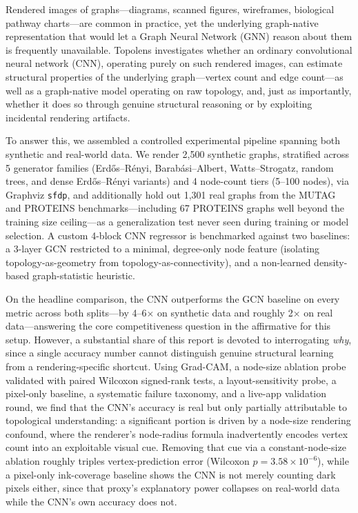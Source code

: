 \documentclass[11pt,letterpaper]{article}
\numberwithin{equation}{section}
\numberwithin{figure}{section}
\numberwithin{table}{section}
\begin{document}
Rendered images of graphs---diagrams, scanned figures, wireframes, biological pathway charts---are common in practice, yet the underlying graph-native representation that would let a Graph Neural Network (GNN) reason about them is frequently unavailable. Topolens investigates whether an ordinary convolutional neural network (CNN), operating purely on such rendered images, can estimate structural properties of the underlying graph---vertex count and edge count---as well as a graph-native model operating on raw topology, and, just as importantly, whether it does so through genuine structural reasoning or by exploiting incidental rendering artifacts.

To answer this, we assembled a controlled experimental pipeline spanning both synthetic and real-world data. We render 2,500 synthetic graphs, stratified across 5 generator families (Erdős--Rényi, Barabási--Albert, Watts--Strogatz, random trees, and dense Erdős--Rényi variants) and 4 node-count tiers (5--100 nodes), via Graphviz \texttt{sfdp}, and additionally hold out 1,301 real graphs from the MUTAG and PROTEINS benchmarks---including 67 PROTEINS graphs well beyond the training size ceiling---as a generalization test never seen during training or model selection. A custom 4-block CNN regressor is benchmarked against two baselines: a 3-layer GCN restricted to a minimal, degree-only node feature (isolating topology-as-geometry from topology-as-connectivity), and a non-learned density-based graph-statistic heuristic.

On the headline comparison, the CNN outperforms the GCN baseline on every metric across both splits---by 4--6$\times$ on synthetic data and roughly 2$\times$ on real data---answering the core competitiveness question in the affirmative for this setup. However, a substantial share of this report is devoted to interrogating \emph{why}, since a single accuracy number cannot distinguish genuine structural learning from a rendering-specific shortcut. Using Grad-CAM, a node-size ablation probe validated with paired Wilcoxon signed-rank tests, a layout-sensitivity probe, a pixel-only baseline, a systematic failure taxonomy, and a live-app validation round, we find that the CNN's accuracy is real but only partially attributable to topological understanding: a significant portion is driven by a node-size rendering confound, where the renderer's node-radius formula inadvertently encodes vertex count into an exploitable visual cue. Removing that cue via a constant-node-size ablation roughly triples vertex-prediction error (Wilcoxon $p=3.58\times10^{-6}$), while a pixel-only ink-coverage baseline shows the CNN is not merely counting dark pixels either, since that proxy's explanatory power collapses on real-world data while the CNN's own accuracy does not.
\end{document}
